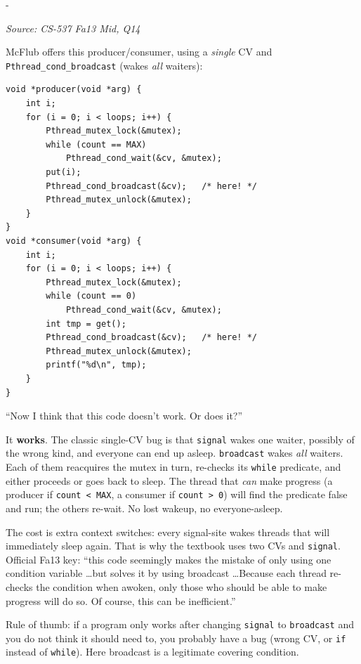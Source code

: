 \documentclass[11pt,a4paper]{article}
\makeatletter
\newcommand{\keepspace}[1]{\par\penalty-100\begingroup
  \setlength{\dimen@}{#1}\dimen@ii\pagegoal\advance\dimen@ii-\pagetotal
  \ifdim\dimen@>\dimen@ii\ifdim\dimen@ii>\z@\vfil\fi\break\fi\endgroup}
\newcounter{qn}[section]
\newenvironment{Qn}[4]{%
  \refstepcounter{qn}\keepspace{7\baselineskip}%
  \begin{tcolorbox}[qboxstyle, title={Q\thesection.\theqn\ \ [#1 \textbar\ #2]\ \ #4}]%
  {\footnotesize\color{g3}\textit{Source: #3}}\par\smallskip%
}{%
  \end{tcolorbox}%
}
\newenvironment{Sol}{%
  \begin{tcolorbox}[sboxstyle, title={Solution}]%
}{%
  \end{tcolorbox}\vspace{0.35em}%
}
\makeatother
\begin{document}
\begin{Qn}{Medium-Hard}{Lect 18}{CS-537 Fa13 Mid, Q14}{Single CV plus \texttt{broadcast}: does it work?}
McFlub offers this producer/consumer, using a \emph{single} CV and
\texttt{Pthread\_cond\_broadcast} (wakes \emph{all} waiters):
\begin{lstlisting}[numbers=none]
void *producer(void *arg) {
    int i;
    for (i = 0; i < loops; i++) {
        Pthread_mutex_lock(&mutex);
        while (count == MAX)
            Pthread_cond_wait(&cv, &mutex);
        put(i);
        Pthread_cond_broadcast(&cv);   /* here! */
        Pthread_mutex_unlock(&mutex);
    }
}
void *consumer(void *arg) {
    int i;
    for (i = 0; i < loops; i++) {
        Pthread_mutex_lock(&mutex);
        while (count == 0)
            Pthread_cond_wait(&cv, &mutex);
        int tmp = get();
        Pthread_cond_broadcast(&cv);   /* here! */
        Pthread_mutex_unlock(&mutex);
        printf("%d\n", tmp);
    }
}
\end{lstlisting}
``Now I think that this code doesn't work. Or does it?''
\end{Qn}
\begin{Sol}
It \textbf{works}. The classic single-CV bug is that \texttt{signal}
wakes one waiter, possibly of the wrong kind, and everyone can end up
asleep. \texttt{broadcast} wakes \emph{all} waiters. Each of them
reacquires the mutex in turn, re-checks its \texttt{while} predicate,
and either proceeds or goes back to sleep. The thread that \emph{can}
make progress (a producer if \texttt{count < MAX}, a consumer if
\texttt{count > 0}) will find the predicate false and run; the others
re-wait. No lost wakeup, no everyone-asleep.

The cost is extra context switches: every signal-site wakes threads
that will immediately sleep again. That is why the textbook uses two
CVs and \texttt{signal}. Official Fa13 key: ``this code seemingly makes
the mistake of only using one condition variable \ldots but solves it
by using broadcast \ldots Because each thread re-checks the condition
when awoken, only those who should be able to make progress will do
so. Of course, this can be inefficient.''

Rule of thumb: if a program only works after changing
\texttt{signal} to \texttt{broadcast} and you do not think it should
need to, you probably have a bug (wrong CV, or \texttt{if} instead of
\texttt{while}). Here broadcast is a legitimate covering condition.
\end{Sol}
\end{document}
